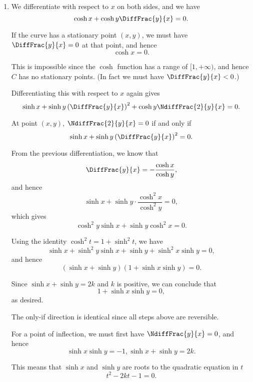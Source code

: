 \Question{\currfilebase}
\begin{enumerate}
    \item We differentiate with respect to \(x\) on both sides, and we have
          \[
              \cosh x + \cosh y \DiffFrac{y}{x} = 0.
          \]

          If the curve has a stationary point \((x, y)\), we must have \(\DiffFrac{y}{x} = 0\) at that point, and hence
          \[
              \cosh x = 0.
          \]

          This is impossible since the \(\cosh\) function has a range of \([1, +\infty)\), and hence \(C\) has no stationary points. (In fact we must have \(\DiffFrac{y}{x} < 0\).)

          Differentiating this with respect to \(x\) again gives
          \[
              \sinh x + \sinh y \left(\DiffFrac{y}{x}\right)^2 + \cosh y \NdiffFrac{2}{y}{x} = 0.
          \]

          At point \((x, y)\), \(\NdiffFrac{2}{y}{x} = 0\) if and only if
          \[
              \sinh x + \sinh y \left(\DiffFrac{y}{x}\right)^2 = 0.
          \]

          From the previous differentiation, we know that
          \[
              \DiffFrac{y}{x} = - \frac{\cosh x}{\cosh y},
          \]
          and hence
          \[
              \sinh x + \sinh y \cdot \frac{\cosh^2 x}{\cosh^2 y} = 0,
          \]
          which gives
          \[
              \cosh^2 y \sinh x + \sinh y \cosh^2 x = 0.
          \]

          Using the identity \(\cosh^2 t = 1 + \sinh^2 t\), we have
          \[
              \sinh x + \sinh^2 y \sinh x + \sinh y + \sinh^2 x \sinh y = 0,
          \]
          and hence
          \[
              (\sinh x + \sinh y)(1 + \sinh x \sinh y) = 0.
          \]

          Since \(\sinh x + \sinh y = 2k\) and \(k\) is positive, we can conclude that
          \[
              1 + \sinh x \sinh y = 0,
          \]
          as desired.

          The only-if direction is identical since all steps above are reversible.

          For a point of inflection, we must first have \(\NdiffFrac{y}{x} = 0\), and hence
          \[
              \sinh x \sinh y = -1, \sinh x + \sinh y = 2k.
          \]

          This means that \(\sinh x\) and \(\sinh y\) are roots to the quadratic equation in \(t\)
          \[
              t^2 - 2kt - 1 = 0.
          \]


\end{enumerate}
